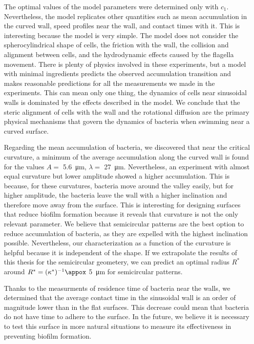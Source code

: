 The optimal values of the model parameters were determined only with $c_1$. Nevertheless, the model replicates other quantities such as mean accumulation in the curved wall, speed profiles near the wall, and contact times with it. This is interesting because the model is very simple. The model does not consider the spherocylindrical shape of cells, the friction with the wall, the collision and alignment between cells, and the hydrodynamic effects caused by the flagella movement. There is plenty of physics involved in these experiments, but a model with minimal ingredients predicts the observed accumulation transition and makes reasonable predictions for all the measurements we made in the experiments. This can mean only one thing, the dynamics of cells near sinusoidal walls is dominated by the effects described in the model. We conclude that the steric alignment of cells with the wall and the rotational diffusion are the primary physical mechanisms that govern the dynamics of bacteria when swimming near a curved surface.

Regarding the mean accumulation of bacteria, we discovered that near the critical curvature, a minimum of the average accumulation along the curved wall is found for the values $A=$ \SI{5.6}{\micro\meter}, $\lambda= $ \SI{27}{\micro\meter}. Nevertheless, an experiment with almost equal curvature but lower amplitude showed a higher accumulation. This is because, for these curvatures, bacteria move around the valley easily, but for higher amplitude, the bacteria leave the wall with a higher inclination and therefore move away from the surface. This is interesting for designing surfaces that reduce biofilm formation because it reveals that curvature is not the only relevant parameter. We believe that semicircular patterns are the best option to reduce accumulation of bacteria, as they are expelled with the highest inclination possible. Nevertheless, our characterization as a function of the curvature is helpful because it is independent of the shape. If we extrapolate the results of this thesis for the semicircular geometery, we can predict an optimal radius $R^*$ around $R^*=(\kappa^*)^{-1}\appox$ \SI{5}{\micro\meter} for semicircular patterns.

Thanks to the measurments of residence time of bacteria near the walls, we determined that the average contact time in the sinusoidal wall is an order of magnitude lower than in the flat surfaces. This decrease could mean that bacteria do not have time to adhere to the surface. In the future, we believe it is necessary to test this surface in more natural situations to measure its effectiveness in preventing biofilm formation. 

